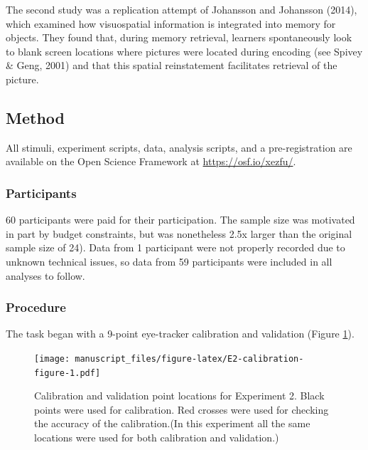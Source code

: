 \documentclass[
  man,floatsintext]{apa6}
\begin{document}
The second study was a replication attempt of Johansson and Johansson (2014),
which examined how visuospatial information is integrated into memory
for objects. They found that, during memory retrieval, learners
spontaneously look to blank screen locations where pictures were located
during encoding (see Spivey \& Geng, 2001) and that
this spatial reinstatement facilitates retrieval of the picture.

\subsection{Method}\label{method-1}

All stimuli, experiment scripts, data, analysis scripts, and a
pre-registration are available on the Open Science Framework at
\url{https://osf.io/xezfu/}.

\subsubsection{Participants}\label{participants-2}

60 participants were paid for their participation.
The sample size was motivated in part by budget constraints, but was
nonetheless 2.5x larger than the original sample size of 24).
Data from 1 participant were not properly
recorded due to unknown technical issues, so data from 59 participants
were included in all analyses to follow.

\subsubsection{Procedure}\label{procedure-1}

The task began with a 9-point eye-tracker calibration
and validation (Figure \ref{fig:E2-calibration-figure}).

\begin{figure}
\centering
\texttt{[image: manuscript\_files/figure-latex/E2-calibration-figure-1.pdf]}
\caption{\label{fig:E2-calibration-figure}Calibration and validation point locations for Experiment 2. Black points were used for calibration. Red crosses were used for checking the accuracy of the calibration.(In this experiment all the same locations were used for both calibration and validation.)}
\end{figure}
\end{document}

